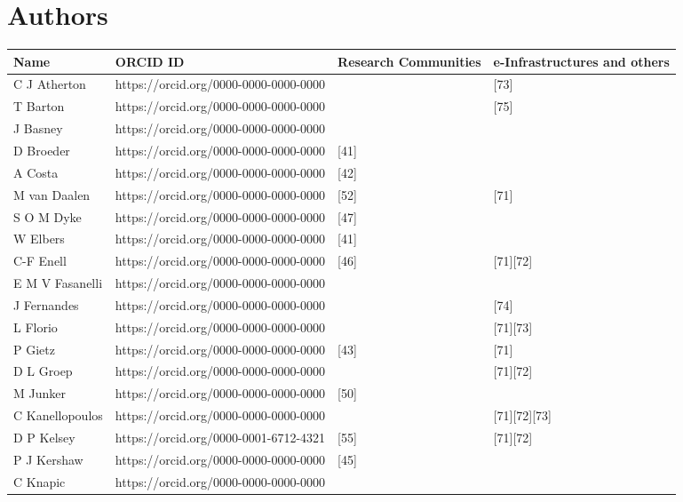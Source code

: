 
\section{Authors}  \label{Authors}

\begin{center}
\begin{longtable}{|p{2.5cm}|p{5.6cm}|p{3.5cm}|p{3.8cm}|} 
\hline
Name
&ORCID ID
&Research Communities
&e-Infrastructures and others \\
\hline\hline
\endhead
C J Atherton
&https://orcid.org/0000-0000-0000-0000
&
&[73]\\
\hline
T Barton
&https://orcid.org/0000-0000-0000-0000
&
&[75]\\
\hline
J Basney
&https://orcid.org/0000-0000-0000-0000
&
&\\
\hline
D Broeder
&https://orcid.org/0000-0000-0000-0000
&[41]
&\\
\hline
A Costa
&https://orcid.org/0000-0000-0000-0000
&[42]
&\\
\hline
M van Daalen
&https://orcid.org/0000-0000-0000-0000
&[52]
&[71]\\
\hline
S O M Dyke
&https://orcid.org/0000-0000-0000-0000
&[47]
&\\
\hline
W Elbers
&https://orcid.org/0000-0000-0000-0000
&[41]
&\\
\hline
C-F Enell
&https://orcid.org/0000-0000-0000-0000
&[46]
&[71][72]\\
\hline
E M V Fasanelli
&https://orcid.org/0000-0000-0000-0000
&
&\\
\hline
J Fernandes 
&https://orcid.org/0000-0000-0000-0000
&
&[74]\\
\hline
L Florio
&https://orcid.org/0000-0000-0000-0000
&
&[71][73]\\
\hline
P Gietz
&https://orcid.org/0000-0000-0000-0000
&[43]
&[71]\\
\hline
D L Groep
&https://orcid.org/0000-0000-0000-0000
&
&[71][72]\\
\hline
M Junker
&https://orcid.org/0000-0000-0000-0000
&[50]
&\\
\hline
C Kanellopoulos
&https://orcid.org/0000-0000-0000-0000
&
&[71][72][73]\\
\hline
D P Kelsey
&https://orcid.org/0000-0001-6712-4321
&[55]
&[71][72]\\
\hline
P J Kershaw
&https://orcid.org/0000-0000-0000-0000
&[45]
&\\
\hline
C Knapic
&https://orcid.org/0000-0000-0000-0000

\end{longtable}
\end{center}
